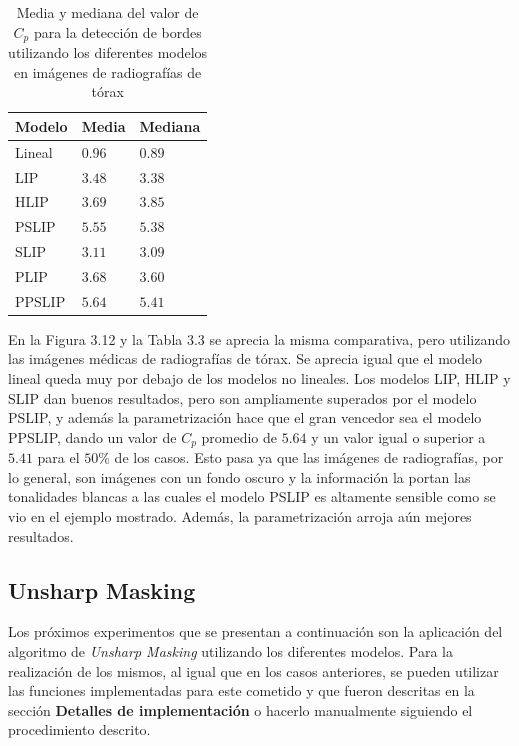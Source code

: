 \begin{table}
	\begin{center}
		\begin{tabular}{|l|l|l|}
			\hline 
			Modelo & Media & Mediana\\
			\hline
			Lineal & $0.96$ & $0.89$\\
			\hline
			LIP & $3.48$ & $3.38$\\
			\hline
			HLIP & $3.69$ & $3.85$\\
			\hline
			PSLIP & $5.55$ & $5.38$\\
			\hline
			SLIP & $3.11$ & $3.09$\\
			\hline
			PLIP & $3.68$ & $3.60$\\
			\hline
			PPSLIP & $5.64$ & $5.41$\\
			\hline
		\end{tabular}
		\caption{Media y mediana del valor de $C_p$ para la detecci\'on de bordes utilizando los diferentes modelos en im\'agenes de radiograf\'ias de t\'orax}
	\end{center}
\end{table}

En la Figura 3.12 y la Tabla 3.3 se aprecia la misma comparativa, pero utilizando las im\'agenes m\'edicas de radiograf\'ias de t\'orax. Se aprecia igual que el modelo lineal queda muy por debajo de los modelos no lineales. Los modelos LIP, HLIP y SLIP dan buenos resultados, pero son ampliamente superados por el modelo PSLIP, y adem\'as la parametrizaci\'on hace que el gran vencedor sea el modelo PPSLIP, dando un valor de $C_p$ promedio de $5.64$ y un valor igual o superior a $5.41$ para el $50\%$  de los casos. Esto pasa ya que las im\'agenes de radiograf\'ias, por lo general, son im\'agenes con un fondo oscuro y la informaci\'on la portan las tonalidades blancas a las cuales el modelo PSLIP es altamente sensible como se vio en el ejemplo mostrado. Adem\'as, la parametrizaci\'on arroja a\'un mejores resultados. 

\subsection{Unsharp Masking}

Los pr\'oximos experimentos que se presentan a continuaci\'on son la aplicaci\'on del algoritmo de \textit{Unsharp Masking} utilizando los diferentes modelos. Para la realizaci\'on de los mismos, al igual que en los casos anteriores, se pueden utilizar las funciones implementadas para este cometido y que fueron descritas en la secci\'on \textbf{Detalles de implementaci\'on} o hacerlo manualmente siguiendo el procedimiento descrito.

